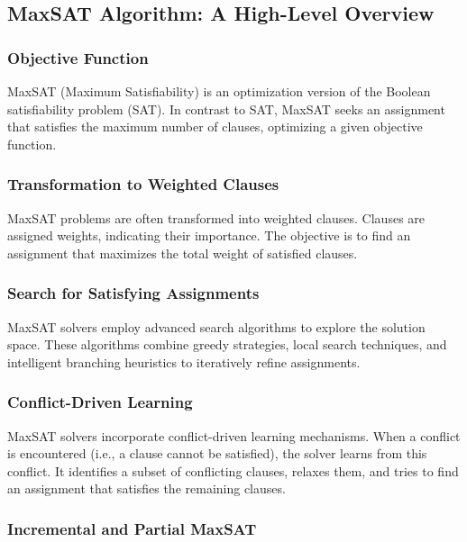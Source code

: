 \subsection{MaxSAT Algorithm: A High-Level Overview}

\subsubsection{Objective Function}

MaxSAT (Maximum Satisfiability) is an optimization version of the Boolean satisfiability problem (SAT). In contrast to SAT, MaxSAT seeks an assignment that satisfies the maximum number of clauses, optimizing a given objective function.

\subsubsection{Transformation to Weighted Clauses}

MaxSAT problems are often transformed into weighted clauses. Clauses are assigned weights, indicating their importance. The objective is to find an assignment that maximizes the total weight of satisfied clauses.

\subsubsection{Search for Satisfying Assignments}

MaxSAT solvers employ advanced search algorithms to explore the solution space. These algorithms combine greedy strategies, local search techniques, and intelligent branching heuristics to iteratively refine assignments.

\subsubsection{Conflict-Driven Learning}

MaxSAT solvers incorporate conflict-driven learning mechanisms. When a conflict is encountered (i.e., a clause cannot be satisfied), the solver learns from this conflict. It identifies a subset of conflicting clauses, relaxes them, and tries to find an assignment that satisfies the remaining clauses.

\subsubsection{Incremental and Partial MaxSAT}

